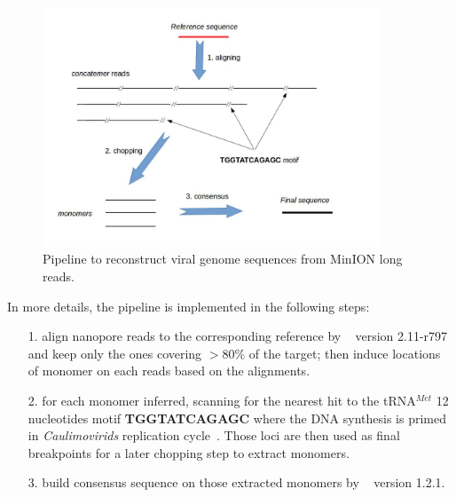 \begin{figure}[ht]
\centerline{\includegraphics[width=0.9\textwidth]{images/concatemer.jpg}}
\caption{Pipeline to reconstruct viral genome sequences from MinION long reads.}
\label{fig:concat_ref_workflow}
\end{figure}

In more details, the pipeline is implemented in the following steps: 
\begin{itemize}
\item[1.] align nanopore reads to the corresponding reference by \minimap{}~\cite{Li2016} version 2.11-r797 and keep only the ones covering $>80\%$ of the target; then induce locations of monomer on each reads based on the alignments.
\item[2.] for each monomer inferred, scanning for the nearest hit to the tRNA$^{Met}$ 12 nucleotides motif \textbf{TGGTATCAGAGC} where the DNA synthesis is primed in \emph{Caulimovirids} replication cycle~\cite{Bhat2016badnaviruses,Sukal2018characterization}. Those loci are then used as final breakpoints for a later chopping step to extract monomers.
\item[3.] build consensus sequence on those extracted monomers by \racon{}~\cite{Vaser2017racon} version 1.2.1.
\end{itemize}

